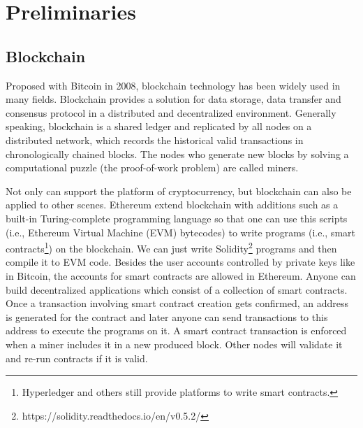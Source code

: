\documentclass[conference]{IEEEtran}
\begin{document}
\section{Preliminaries}
\label{preli}

    \subsection{Blockchain}
    Proposed with Bitcoin \cite{nakamoto2008bitcoin} in 2008, blockchain technology has been widely used in many fields. Blockchain provides a solution for data storage, data transfer and consensus protocol in a distributed and decentralized environment. Generally speaking, blockchain is a shared ledger and replicated by all nodes on a distributed network, which records the historical valid transactions in chronologically chained blocks. The nodes who generate new blocks by solving a computational puzzle (the proof-of-work problem) are called miners.
    
    Not only can support the platform of cryptocurrency, but blockchain can also be applied to other scenes. Ethereum \cite{wood2014ethereum} extend blockchain with additions such as a built-in Turing-complete programming language so that one can use this scripts (i.e., Ethereum Virtual Machine (EVM) bytecodes) to write programs (i.e., smart contracts\footnote{Hyperledger and others still provide platforms to write smart contracts.}) on the blockchain. We can just write Solidity\footnote{https://solidity.readthedocs.io/en/v0.5.2/} programs and then compile it to EVM code. Besides the user accounts controlled by private keys like in Bitcoin, the accounts for smart contracts are allowed in Ethereum. Anyone can build decentralized applications which consist of a collection of smart contracts. Once a transaction involving smart contract creation gets confirmed, an address is generated for the contract and later anyone can send transactions to this address to execute the programs on it. A smart contract transaction is enforced when a miner includes it in a new produced block. Other nodes will validate it and re-run contracts if it is valid.
    
\end{document}
